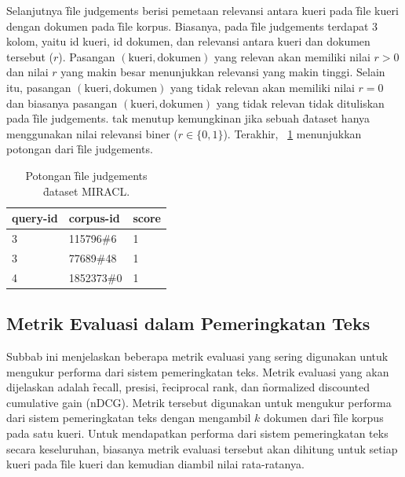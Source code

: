     Selanjutnya \f{file} judgements berisi pemetaan relevansi antara kueri pada \f{file} kueri dengan dokumen pada \f{file} korpus. Biasanya, pada \f{file} judgements terdapat 3 kolom, yaitu id kueri, id dokumen, dan relevansi antara kueri dan dokumen tersebut ($r$). Pasangan $(\text{kueri}, \text{dokumen})$ yang relevan akan memiliki nilai $r > 0$ dan nilai $r$ yang makin besar menunjukkan relevansi yang makin tinggi. Selain itu, pasangan $(\text{kueri}, \text{dokumen})$ yang tidak relevan akan memiliki nilai $r = 0$ dan biasanya pasangan $(\text{kueri}, \text{dokumen})$ yang tidak relevan tidak dituliskan pada \f{file judgements}. tak menutup kemungkinan jika sebuah \f{dataset} hanya menggunakan nilai relevansi biner ($r \in \{0, 1\}$). Terakhir, \tab~\ref{tab:judgements-file-example} menunjukkan potongan dari \f{file judgements}.

    \begin{table}
        \centering
        \caption{Potongan \f{file} judgements \f{dataset} MIRACL.}
        \label{tab:judgements-file-example}
        \begin{tabular}{|l|l|l|}
            \hline
            \textbf{query-id} & \textbf{corpus-id} & \textbf{score} \\ \hline
            3                 & 115796\#6          & 1              \\ \hline
            3                 & 77689\#48          & 1              \\ \hline
            4                 & 1852373\#0         & 1              \\ \hline
        \end{tabular}
    \end{table}
    


    \subsection{Metrik Evaluasi dalam Pemeringkatan Teks}
    \label{sec:metrik-evaluasi}

    Subbab ini menjelaskan beberapa metrik evaluasi yang sering digunakan untuk mengukur performa dari sistem pemeringkatan teks. Metrik evaluasi yang akan dijelaskan adalah \f{recall}, presisi, \f{reciprocal rank}, dan \f{normalized discounted cumulative gain} (nDCG). Metrik tersebut digunakan untuk mengukur performa dari sistem pemeringkatan teks dengan mengambil $k$ dokumen dari \f{file} korpus pada satu kueri. Untuk mendapatkan performa dari sistem pemeringkatan teks secara keseluruhan, biasanya metrik evaluasi tersebut akan dihitung untuk setiap kueri pada \f{file} kueri dan kemudian diambil nilai rata-ratanya.

